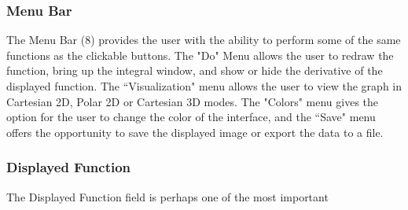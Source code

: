 \documentclass{article}[12 pt]
\begin{document}
			\subsubsection{Menu Bar}
			The Menu Bar (8) provides the user with the ability to perform some of the same functions as the clickable buttons. The "Do" Menu allows the user to redraw the function, bring up the integral window, and show or hide the derivative of the displayed function. The ``Visualization" menu allows the user to view the graph in Cartesian 2D, Polar 2D or Cartesian 3D modes. The "Colors" menu gives the option for the user to change the color of the interface, and the ``Save" menu offers the opportunity to save the displayed image or export the data to a file. 
 	
			\subsubsection{Displayed Function}
			The Displayed Function field is perhaps one of the most important 
 				
\end{document}
